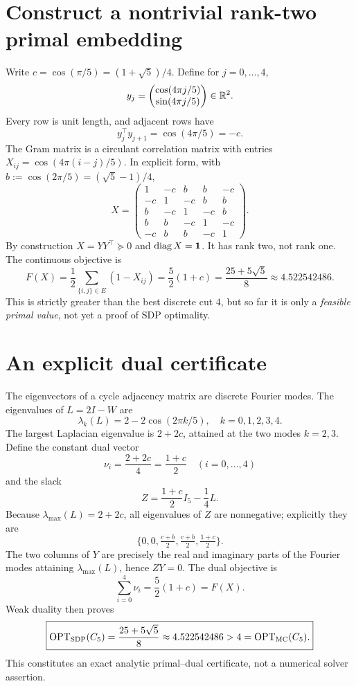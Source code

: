 \section{Construct a nontrivial rank-two primal embedding}
Write $c=\cos(\pi/5)=(1+\sqrt5)/4$. Define for $j=0,\ldots,4$,
\begin{equation}\label{eq:c5Y}
y_j=\begin{pmatrix}\cos(4\pi j/5)\\ \sin(4\pi j/5)\end{pmatrix}\in\mathbb{R}^2.
\end{equation}
Every row is unit length, and adjacent rows have
\[
y_j^\top y_{j+1}=\cos(4\pi/5)=-c.
\]
The Gram matrix is a circulant correlation matrix with entries $X_{ij}=\cos(4\pi(i-j)/5)$. In explicit form, with $b:=\cos(2\pi/5)=(\sqrt5-1)/4$,
\begin{equation}\label{eq:c5X}
X=\begin{pmatrix}
1&-c&b&b&-c\\
-c&1&-c&b&b\\
b&-c&1&-c&b\\
b&b&-c&1&-c\\
-c&b&b&-c&1
\end{pmatrix}.
\end{equation}
By construction $X=YY^\top\succeq0$ and $\operatorname{diag} X=\boldsymbol{1}$. It has rank two, not rank one. The continuous objective is
\begin{equation}\label{eq:c5score}
F(X)=\frac12\sum_{\{i,j\}\in E}(1-X_{ij})=\frac52(1+c)
=\frac{25+5\sqrt5}{8}\approx4.522542486.
\end{equation}
This is strictly greater than the best discrete cut $4$, but so far it is only a \emph{feasible primal value}, not yet a proof of SDP optimality.

\section{An explicit dual certificate}
The eigenvectors of a cycle adjacency matrix are discrete Fourier modes. The eigenvalues of $L=2I-W$ are
\begin{equation}
\lambda_k(L)=2-2\cos(2\pi k/5),\quad k=0,1,2,3,4.
\end{equation}
The largest Laplacian eigenvalue is $2+2c$, attained at the two modes $k=2,3$. Define the constant dual vector
\[
\nu_i=\frac{2+2c}{4}=\frac{1+c}{2}\quad (i=0,\ldots,4)
\]
and the slack
\begin{equation}
Z=\frac{1+c}{2}I_5-\frac14L.
\end{equation}
Because $\lambda_{\max}(L)=2+2c$, all eigenvalues of $Z$ are nonnegative; explicitly they are
\[
\bigl\{0,0,\tfrac{c+b}{2},\tfrac{c+b}{2},\tfrac{1+c}{2}\bigr\}.
\]
The two columns of $Y$ are precisely the real and imaginary parts of the Fourier modes attaining $\lambda_{\max}(L)$, hence $ZY=0$. The dual objective is
\[
\sum_{i=0}^4\nu_i=\frac52(1+c)=F(X).
\]
Weak duality then proves
\begin{equation}\label{eq:c5cert}
\boxed{\operatorname{OPT}_{\mathrm{SDP}}(C_5)=\frac{25+5\sqrt5}{8}\approx4.522542486>4=\operatorname{OPT}_{\mathrm{MC}}(C_5).}
\end{equation}
This constitutes an exact analytic primal--dual certificate, not a numerical solver assertion.

